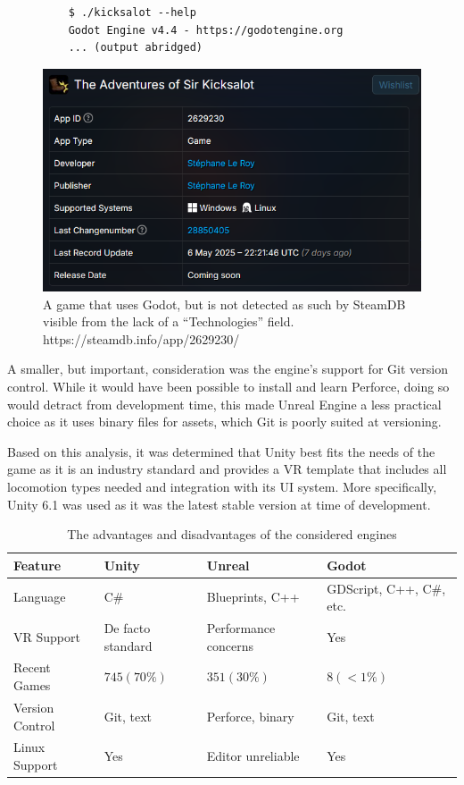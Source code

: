\documentclass[sigconf,authordraft]{acmart}
\begin{document}
\begin{figure}
  \begin{lstlisting}
    $ ./kicksalot --help
    Godot Engine v4.4 - https://godotengine.org
    ... (output abridged)
  \end{lstlisting}
  \includegraphics[width=0.8\linewidth]{godot-false-negative.png}
  \caption{\label{fig:godot_false_negative} A game that uses Godot, but is not
    detected as such by SteamDB visible from the lack of a ``Technologies''
  field. https://steamdb.info/app/2629230/}
\end{figure}

A smaller, but important, consideration was the engine's support for Git version
control. While it would have been possible to install and learn Perforce, doing
so would detract from development time, this made Unreal Engine a less practical
choice as it uses binary files for assets, which Git is poorly suited at
versioning.

Based on this analysis, it was determined that Unity best fits the needs of the
game as it is an industry standard and provides a VR template that includes all
locomotion types needed and integration with its UI system. More specifically,
Unity 6.1 was used as it was the latest stable version at time of development.

\begin{table}
  \caption{The advantages and disadvantages of the considered engines}
  \label{table:engine_compare}
  \begin{tabular}{llll}\toprule
    Feature & Unity & Unreal & Godot \\\midrule

    Language & C\# & Blueprints, C++ & GDScript, C++, C\#, etc. \\
    VR Support & De facto standard & Performance concerns & Yes \\
    Recent Games & $745 (70\%)$ & $351 (30\%)$ & $8 (<1\%)$ \\
    Version Control & Git, text & Perforce, binary & Git, text \\
    Linux Support & Yes & Editor unreliable & Yes \\

    \bottomrule
  \end{tabular}
\end{table}
\end{document}
